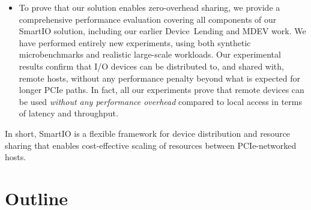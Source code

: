 \begin{itemize}


	\item To prove that our solution enables zero-overhead sharing, we provide a comprehensive 
		performance evaluation covering all components of our SmartIO solution,
		including our earlier Device~Lending and MDEV work. We have performed entirely new
		experiments, using both synthetic microbenchmarks and realistic large-scale workloads.
		Our experimental results confirm that I/O devices can be distributed to, and shared with,
		remote hosts, without any performance penalty beyond what is expected for longer PCIe paths. In fact, all our
		experiments prove that remote devices can be used \emph{without any performance overhead}
		compared to local access in terms of latency and throughput.


\end{itemize}

In short, SmartIO is a flexible framework for device distribution and resource sharing that enables
cost-effective scaling of resources between PCIe-networked hosts.

\section{Outline}
